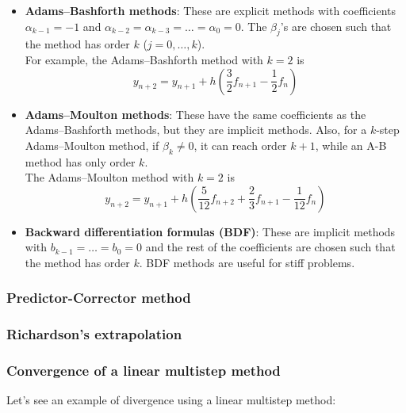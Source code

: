 \begin{itemize}
    \item \textbf{Adams–Bashforth methods}: These are explicit methods with coefficients $\alpha_{k-1} = -1$ and $\alpha_{k-2} = \alpha_{k-3} = \ldots = \alpha_0 = 0$. The $\beta_j$'s are chosen such that the method has order $k$ ($j = 0, \ldots, k$).\\
    
    For example, the Adams–Bashforth method with $k=2$ is $$y_{n+2} = y_{n+1} + h\left(\frac{3}{2}f_{n+1} - \frac{1}{2}f_n\right)$$
    
    \item \textbf{Adams–Moulton methods}: These have the same coefficients as the Adams–Bashforth methods, but they are implicit methods. Also, for a $k$-step Adams–Moulton method, if $\beta_k \not= 0$, it can reach order $k+1$, while an A-B method has only order $k$.\\
    
    The Adams–Moulton method with $k = 2$ is $$y_{n+2} = y_{n+1} + h\left(\frac{5}{12}f_{n+2} + \frac{2}{3}f_{n+1} - \frac{1}{12}f_n \right)$$
    
    \item \textbf{Backward differentiation formulas (BDF)}: These are implicit methods with $b_{k-1} = \ldots = b_{0} = 0$ and the rest of the coefficients are chosen such that the method has order $k$. BDF methods are useful for stiff problems.
\end{itemize}

\newpage

\subsubsection{Predictor-Corrector method}
\subsubsection{Richardson's extrapolation}
\subsubsection{Convergence of a linear multistep method}

Let's see an example of divergence using a linear multistep method:

